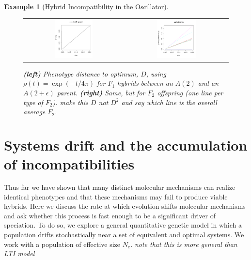 \documentclass{article}
\newcommand{\plr}[1]{\todo[color=blue!25]{#1}}
\newcommand{\plri}[1]{{\color{blue}\it #1}}
\newcommand{\plr}[1]{{\color{blue}\it #1}}
\newcommand{\plri}[1]{\plr{#1}}
\newcommand{\1}{\mathbbm{1}}
\newtheorem{example}{Example}
\begin{document}
\begin{example}[Hybrid Incompatibility in the Oscillator]
  \begin{figure}[H]
  \label{fig:osc_incompat}
    \centering
    \begin{tabular}{cc}
    \includegraphics[width=0.4\textwidth]{figures/f1_quartic2} &
    \includegraphics[width=0.4\textwidth]{figures/f2_quad2}
    \end{tabular}
    \caption{
    \textbf{(left)} Phenotype distance to optimum, $D$, using $\rho(t) = \exp(-t/4\pi)$
    for $F_1$ hybrids between an $A(2)$ and an $A(2+\epsilon)$ parent.
    \textbf{(right)} Same, but for $F_2$ offspring (one line per type of $F_2$).
    \plri{make this $D$ not $D^2$ and say which line is the overall average $F_2$.}
    } \label{fig:osc_incompat}
  \end{figure}
\end{example}



\section*{Systems drift and the accumulation of incompatibilities}

Thus far we have shown that many distinct molecular mechanisms can realize identical phenotypes
and that these mechanisms may fail to produce viable hybrids.
Here we discuss the rate at which evolution shifts molecular mechanisms
and ask whether this process is fast enough to be a significant driver of speciation.
To do so, we explore a general quantitative genetic model in which a population drifts stochastically
near a set of equivalent and optimal systems. We work with a population of effective size $N_e$. 
\plri{note that this is more general than LTI model}
\end{document}
